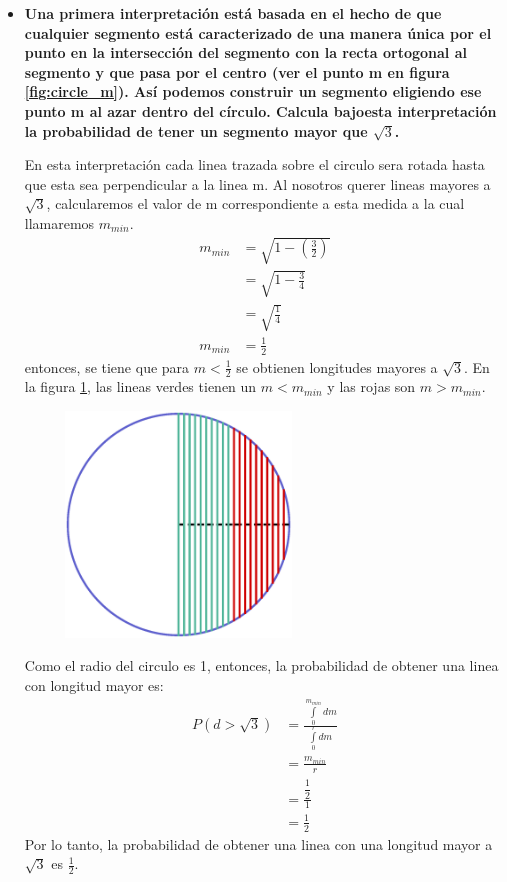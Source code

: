 \begin{itemize}
    \item \textbf{Una primera interpretación está basada en el hecho de que cualquier segmento está caracterizado de una manera única por el punto en la intersección del segmento con la recta ortogonal al segmento y que pasa por el centro (ver el punto m en figura \ref{fig:circle_m}). Así podemos construir un segmento eligiendo ese punto m al azar dentro del círculo. Calcula bajoesta interpretación la probabilidad de tener un segmento mayor que $\sqrt{3}$.}

          En esta interpretación cada linea trazada sobre el circulo sera rotada hasta que esta sea perpendicular a la linea m. Al nosotros querer lineas mayores a $\sqrt{3}$, calcularemos el valor de m correspondiente a esta medida a la cual llamaremos $m_{min}$.
          \begin{align*}
              m_{min} & = \sqrt{1-\left(\frac{3}{2}\right)} \\
                      & = \sqrt{1-\frac{3}{4}}              \\
                      & = \sqrt{\frac{1}{4}}                \\
              m_{min} & = \frac{1}{2}
          \end{align*}
          entonces, se tiene que para $m<\frac{1}{2}$ se obtienen longitudes mayores a $\sqrt{3}$. En la figura \ref{fig:problema2_interpretacion1}, las lineas verdes tienen un $m<m_{min}$ y las rojas son $m>m_{min}$.
          \begin{figure}[H]
              \centering
              \includegraphics[width=6cm]{Graphics/circle_2.eps}
              \caption{}
              \label{fig:problema2_interpretacion1}
          \end{figure}
          Como el radio del circulo es 1, entonces, la probabilidad de obtener una linea con longitud mayor es:
          \begin{align*}
              P(d>\sqrt{3}) & = \frac{\int\limits_0^{m_{min}}dm}{\int\limits_0^{r}dm} \\
                            & = \frac{m_{min}}{r}                                     \\
                            & = \frac{\dfrac{1}{2}}{1}                                \\
                            & = \frac{1}{2}
          \end{align*}
          Por lo tanto, la probabilidad de obtener una linea con una longitud mayor a $\sqrt{3}$ es $\frac{1}{2}$.
\end{itemize}
